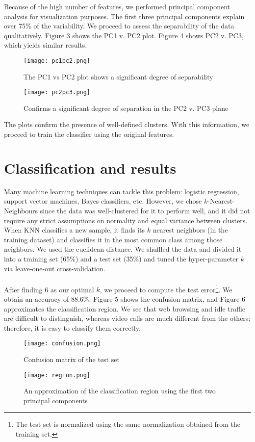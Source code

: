 \documentclass[11pt, USenglish]{article}
\begin{document}
Because of the high number of features, we performed principal component analysis for visualization purposes. The first three principal components explain over 75\% of the variability. We proceed to assess the separability of the data qualitatively. Figure 3 shows the PC1 v. PC2 plot. Figure 4 shows PC2 v. PC3, which yields similar results.
\begin{figure}
\centering
		\texttt{[image: pc1pc2.png]}
		\caption{The PC1 vs PC2 plot shows a significant degree of separability}
\vspace{8mm} 
	\centering
	\texttt{[image: pc2pc3.png]}
	\caption{Confirms a significant degree of separation in the PC2 v. PC3 plane}
\end{figure}

The plots confirm the presence of well-defined clusters. With this information, we proceed to train the classifier using the original features.

\section{Classification and results}
Many machine learning techniques can tackle this problem: logistic regression, support vector machines, Bayes classifiers, etc. However, we chose $k$-Nearest-Neighbours since the data was well-clustered for it to perform well, and it did not require any strict assumptions on normality and equal variance between clusters. When KNN classifies a new sample, it finds its $k$ nearest neighbors (in the training dataset) and classifies it in the most common class among those neighbors. We used the euclidean distance. We shuffled the data and divided it into a training set (65\%) and a test set (35\%) and tuned the hyper-parameter $k$ via leave-one-out cross-validation. 
\\\\
After finding 6 as our optimal $k$, we proceed to compute the test error\footnote{The test set is normalized using the same normalization obtained from the training set.}. We obtain an accuracy of 88.6\%. Figure 5 shows the confusion matrix, and Figure 6 approximates the classification region. We see that web browsing and idle traffic are difficult to distinguish, whereas video calls are much different from the others; therefore, it is easy to classify them correctly.
\begin{figure}
	\centering
	\texttt{[image: confusion.png]}
	\caption{Confusion matrix of the test set}
\end{figure}
\begin{figure}
	
	\centering
	\texttt{[image: region.png]}
	\caption{An approximation of the classification region using the first two principal components}
\end{figure}
\end{document}
